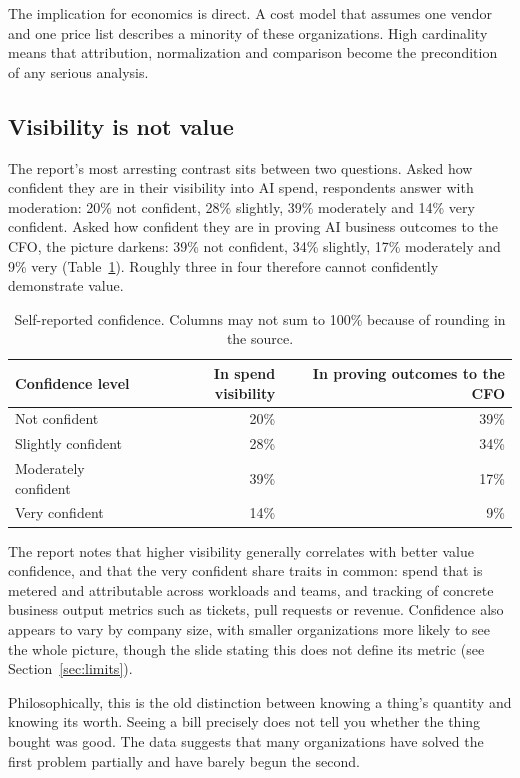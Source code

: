 \documentclass[11pt,a4paper]{article}
\begin{document}
The implication for economics is direct. A cost model that assumes one vendor and one price list describes a minority of these organizations. High cardinality means that attribution, normalization and comparison become the precondition of any serious analysis.

\subsection{Visibility is not value}

The report's most arresting contrast sits between two questions. Asked how confident they are in their visibility into AI spend, respondents answer with moderation: 20\% not confident, 28\% slightly, 39\% moderately and 14\% very confident. Asked how confident they are in proving AI business outcomes to the CFO, the picture darkens: 39\% not confident, 34\% slightly, 17\% moderately and 9\% very (Table~\ref{tab:confidence}). Roughly three in four therefore cannot confidently demonstrate value.

\begin{table}[h]
\centering
\small
\begin{tabular}{@{}lrr@{}}
\toprule
Confidence level & In spend visibility & In proving outcomes to the CFO \\
\midrule
Not confident & 20\% & 39\% \\
Slightly confident & 28\% & 34\% \\
Moderately confident & 39\% & 17\% \\
Very confident & 14\% & 9\% \\
\bottomrule
\end{tabular}
\caption{Self-reported confidence. Columns may not sum to 100\% because of rounding in the source.}
\label{tab:confidence}
\end{table}

The report notes that higher visibility generally correlates with better value confidence, and that the very confident share traits in common: spend that is metered and attributable across workloads and teams, and tracking of concrete business output metrics such as tickets, pull requests or revenue. Confidence also appears to vary by company size, with smaller organizations more likely to see the whole picture, though the slide stating this does not define its metric (see Section~\ref{sec:limits}).

Philosophically, this is the old distinction between knowing a thing's quantity and knowing its worth. Seeing a bill precisely does not tell you whether the thing bought was good. The data suggests that many organizations have solved the first problem partially and have barely begun the second.
\end{document}
